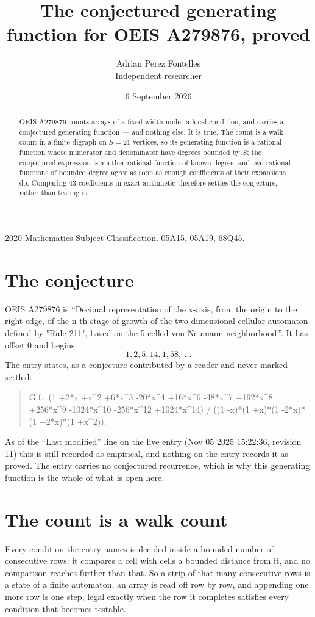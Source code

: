 \documentclass[11pt,a4paper]{article}
\title{The conjectured generating function for OEIS A279876, proved}
\author{Adrian Perez Fontelles\\ \small Independent researcher}
\date{6 September 2026}
\theoremstyle{plain}
\theoremstyle{definition}
\begin{document}
\maketitle

\begin{abstract}
OEIS A279876 counts arrays of a fixed width under a local condition, and carries a conjectured
generating function --- and nothing else. It is true. The count is a walk count in a finite
digraph on $S=21$ vertices, so its generating function is a rational function whose numerator
and denominator have degrees bounded by $S$; the conjectured expression is another rational
function of known degree; and two rational functions of bounded degree agree as soon as enough
coefficients of their expansions do. Comparing $43$ coefficients in exact arithmetic
therefore settles the conjecture, rather than testing it.
\end{abstract}

\noindent\small 2020 Mathematics Subject Classification. 05A15, 05A19, 68Q45.\normalsize

\section{The conjecture}

OEIS A279876 is ``Decimal representation of the x-axis, from the origin to the right edge, of the n-th stage of growth of the two-dimensional cellular automaton defined by "Rule 211", based on the 5-celled von Neumann neighborhood.''. It has offset $0$ and begins
\[
1, 2, 5, 14, 1, 58,\ \dots
\]
The entry states, as a conjecture contributed by a reader and never marked settled:
\begin{quote}
G.f.: (1 +2*x +x\^{}2 +6*x\^{}3 -20*x\^{}4 +16*x\^{}6 -48*x\^{}7 +192*x\^{}8 +256*x\^{}9 -1024*x\^{}10 -256*x\^{}12 +1024*x\^{}14) / ((1 -x)*(1 +x)*(1 -2*x)*(1 +2*x)*(1 +x\^{}2)).
\end{quote}
As of the ``Last modified'' line on the live entry (Nov 05 2025 15:22:36, revision 11) this is still
recorded as empirical, and nothing on the entry records it as proved. The entry carries no
conjectured recurrence, which is why this generating function is the whole of what is open
here.

\section{The count is a walk count}

Every condition the entry names is decided inside a bounded number of consecutive rows: it
compares a cell with cells a bounded distance from it, and no comparison reaches further than
that. So a strip of that many consecutive rows is a state of a finite automaton, an array is
read off row by row, and appending one more row is one step, legal exactly when the row it
completes satisfies every condition that becomes testable.
\end{document}
